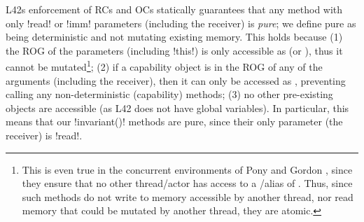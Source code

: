 \label{s:purity}
L42s enforcement of RCs and OCs statically guarantees that any method with only \Q!read! or \Q!imm! parameters (including the receiver) is \emph{pure}; we define pure
as being deterministic and not mutating existing memory. This holds because %
(1) the ROG of the parameters (including \Q!this!) is only accessible as \Q@read@ (or \Q@imm@), thus it cannot be mutated\footnote{This is even true in the concurrent environments of Pony and Gordon \etal, since they ensure that no other thread/actor has access to a \Q@mut@/\Q@capsule@ alias of \Q@this@. 
	Thus, since such methods do not write to memory accessible by another thread, nor read memory that could be mutated by another thread, they are atomic.};
(2) if a capability object is in the ROG of any of the arguments (including the receiver), then it can only be accessed as \Q@read@, preventing calling any 
non-deterministic (capability) methods;
(3) no other pre-existing objects are accessible (as L42 does not have global variables). 
In particular, this means that our \Q!invariant()! methods are pure, since 
their only parameter (the receiver) is \Q!read!.



